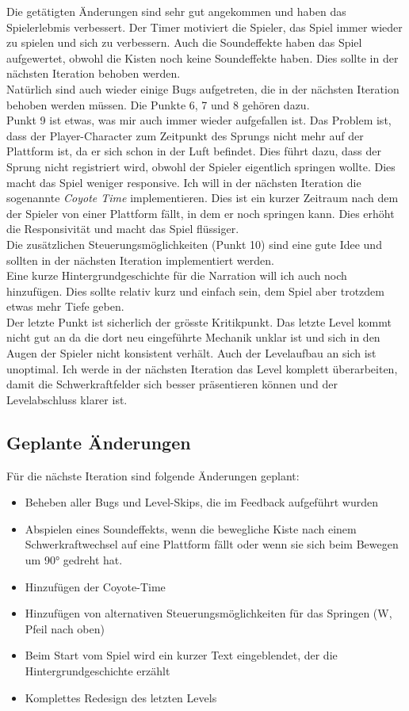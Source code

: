 \documentclass{article}
\begin{document}
Die getätigten Änderungen sind sehr gut angekommen und haben das Spielerlebmis verbessert. Der Timer motiviert die Spieler, das Spiel immer wieder zu spielen und sich zu verbessern.
Auch die Soundeffekte haben das Spiel aufgewertet, obwohl die Kisten noch keine Soundeffekte haben. Dies sollte in der nächsten Iteration behoben werden.
\\
Natürlich sind auch wieder einige Bugs aufgetreten, die in der nächsten Iteration behoben werden müssen. Die Punkte 6, 7 und 8 gehören dazu.
\\
Punkt 9 ist etwas, was mir auch immer wieder aufgefallen ist. Das Problem ist, dass der Player-Character zum Zeitpunkt des Sprungs nicht mehr auf der Plattform ist, da er sich schon in der Luft befindet.
Dies führt dazu, dass der Sprung nicht registriert wird, obwohl der Spieler eigentlich springen wollte. Dies macht das Spiel weniger responsive. Ich will in der nächsten Iteration die sogenannte
\textit{Coyote Time} implementieren. Dies ist ein kurzer Zeitraum nach dem der Spieler von einer Plattform fällt, in dem er noch springen kann. Dies erhöht die Responsivität und macht das Spiel flüssiger.
\\
Die zusätzlichen Steuerungsmöglichkeiten (Punkt 10) sind eine gute Idee und sollten in der nächsten Iteration implementiert werden.
\\
Eine kurze Hintergrundgeschichte für die Narration will ich auch noch hinzufügen. Dies sollte relativ kurz und einfach sein, dem Spiel aber trotzdem etwas mehr Tiefe geben.
\\
Der letzte Punkt ist sicherlich der grösste Kritikpunkt. Das letzte Level kommt nicht gut an da die dort neu eingeführte Mechanik unklar ist und sich in den Augen der Spieler nicht
konsistent verhält. Auch der Levelaufbau an sich ist unoptimal. Ich werde in der nächsten Iteration das Level komplett überarbeiten, damit die Schwerkraftfelder sich besser präsentieren können
und der Levelabschluss klarer ist.

\subsection{Geplante Änderungen}

Für die nächste Iteration sind folgende Änderungen geplant:

\begin{itemize}
    \item Beheben aller Bugs und Level-Skips, die im Feedback aufgeführt wurden
    \item Abspielen eines Soundeffekts, wenn die bewegliche Kiste nach einem Schwerkraftwechsel auf eine Plattform fällt oder wenn sie sich beim Bewegen um 90° gedreht hat.
    \item Hinzufügen der Coyote-Time
    \item Hinzufügen von alternativen Steuerungsmöglichkeiten für das Springen (W, Pfeil nach oben)
    \item Beim Start vom Spiel wird ein kurzer Text eingeblendet, der die Hintergrundgeschichte erzählt
    \item Komplettes Redesign des letzten Levels
\end{itemize}
\end{document}
